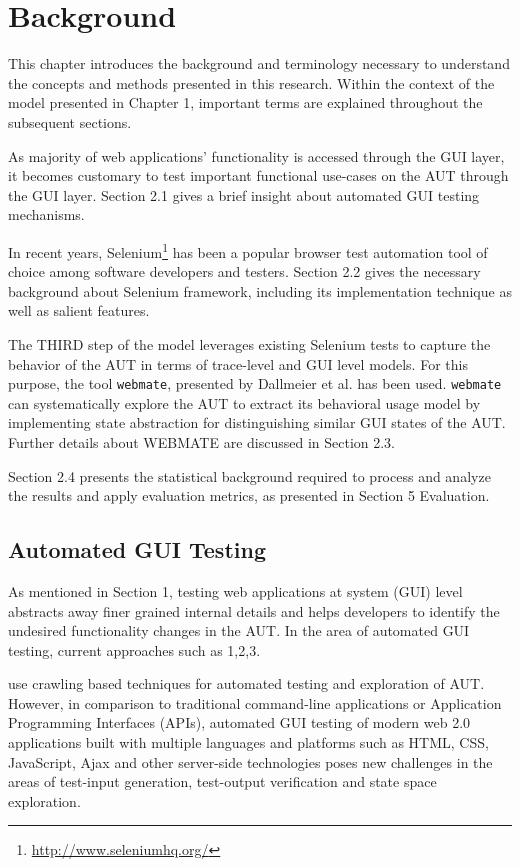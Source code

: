 \chapter{Background}
\label{Chapter2}


This chapter introduces the background and terminology necessary to understand the concepts and methods presented in this research. Within the context of the model presented in Chapter 1, important terms are explained throughout the subsequent sections.

As majority of web applications' functionality is accessed through the GUI layer, it becomes customary to test important functional use-cases on the AUT through the GUI layer. Section 2.1 gives a brief insight about automated GUI testing mechanisms.

In recent years, Selenium\footnote{\url{http://www.seleniumhq.org/}} has been a popular browser test automation tool of choice among software developers and testers. Section 2.2 gives the necessary background about Selenium framework, including its implementation technique as well as salient features.

The THIRD step of the model leverages existing Selenium tests to capture the behavior of the AUT in terms of trace-level and GUI level models. For this purpose, the tool \texttt{webmate}, presented by Dallmeier et al. has been used. \texttt{webmate} can systematically explore the AUT to extract its behavioral usage model by implementing state abstraction for distinguishing similar GUI states of the AUT. Further details about WEBMATE are discussed in Section 2.3.

Section 2.4 presents the statistical background required to process and analyze the results and apply evaluation metrics, as presented in Section 5 Evaluation.

\section{Automated GUI Testing}
\label{sec:AutomatedGUITesting}
As mentioned in Section 1, testing web applications at system (GUI) level abstracts away finer grained internal details and helps developers to identify the undesired functionality changes in the AUT.  In the area of automated GUI testing, current approaches such as  1,2,3.

use crawling based techniques for automated testing and exploration of AUT. However, in comparison to traditional command-line applications or Application Programming Interfaces (APIs), automated GUI testing of modern web 2.0 applications built with multiple languages and platforms such as HTML, CSS, JavaScript, Ajax and other server-side technologies poses new challenges in the areas of test-input generation, test-output verification and state space exploration.

